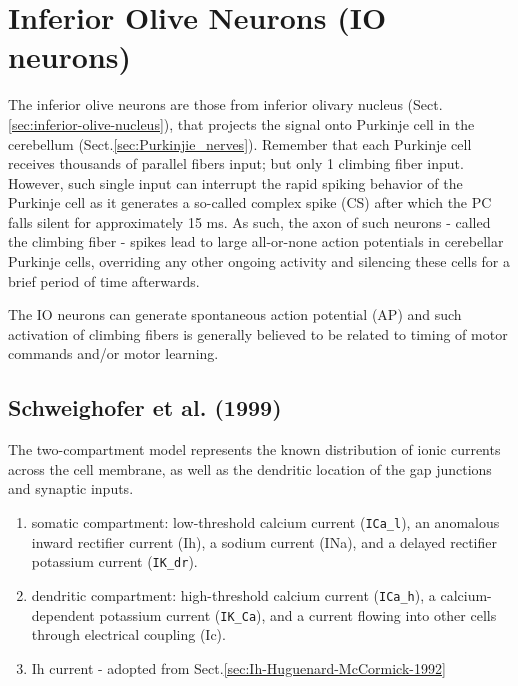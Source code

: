 \chapter{Inferior Olive Neurons (IO neurons)}
\label{sec:Inferior-Olive-neurons}

The inferior olive neurons are those from inferior olivary nucleus
(Sect.\ref{sec:inferior-olive-nucleus}), that projects the signal onto Purkinje cell in
the cerebellum (Sect.\ref{sec:Purkinjie_nerves}).
Remember that each Purkinje cell receives thousands of parallel fibers input;
but only 1 climbing fiber input. However, such single input can interrupt the
rapid spiking behavior of the Purkinje cell as it generates a so-called complex
spike (CS) after which the PC falls silent for approximately 15 ms.
As such, the axon of such neurons - called the climbing fiber - spikes lead to
large all-or-none action potentials in cerebellar Purkinje cells, overriding any
other ongoing activity and silencing these cells for a brief period of time
afterwards.

The IO neurons can generate spontaneous action potential (AP)
and such activation of climbing fibers is generally believed to be related to
timing of motor commands and/or motor learning.

\section{Schweighofer et al. (1999)}
\label{sec:Schweighofer-1999}


The two-compartment model represents the known distribution of ionic currents
across the cell membrane, as well as the dendritic location of the gap junctions
and synaptic inputs.
\begin{enumerate}
  \item somatic compartment:  low-threshold calcium current (\verb!ICa_l!),
an anomalous inward rectifier current (Ih), a sodium current (INa), and
a delayed rectifier potassium current (\verb!IK_dr!).
  
  \item dendritic compartment:
  high-threshold calcium current (\verb!ICa_h!), a calcium-dependent
potassium current (\verb!IK_Ca!), and a current flowing into other cells through
electrical coupling (Ic).


  \item Ih current - adopted from Sect.\ref{sec:Ih-Huguenard-McCormick-1992}
  

\end{enumerate}

